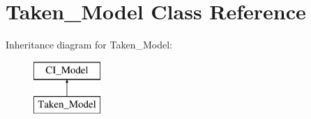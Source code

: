 \hypertarget{class_taken___model}{}\section{Taken\+\_\+\+Model Class Reference}
\label{class_taken___model}
Inheritance diagram for Taken\+\_\+\+Model\+:\begin{figure}[H]
\begin{center}
\leavevmode
\includegraphics[height=2.000000cm]{class_taken___model}
\end{center}
\end{figure}
